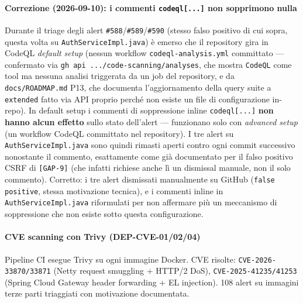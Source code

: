 ﻿\documentclass[a4paper,12pt]{report}
\newcommand{\threat}[1]{\texttt{\small\textcolor{vulnred}{[#1]}}}
\begin{document}
\paragraph{Correzione (2026-09-10): i commenti \texttt{codeql[...]} non sopprimono nulla}
Durante il triage degli alert \texttt{\#588}/\texttt{\#589}/\texttt{\#590}
(stesso falso positivo di cui sopra, questa volta su
\texttt{AuthServiceImpl.java}) è emerso che il repository gira in CodeQL
\emph{default setup} (nessun workflow \texttt{codeql-analysis.yml} committato
--- confermato via \texttt{gh api .../code-scanning/analyses}, che mostra
\texttt{CodeQL} come tool ma nessuna analisi triggerata da un job del
repository, e da \texttt{docs/ROADMAP.md} P13, che documenta l'aggiornamento
della query suite a \texttt{extended} fatto via API proprio perché non esiste
un file di configurazione in-repo). In default setup i commenti di
soppressione inline \texttt{codeql[...]} \textbf{non hanno alcun effetto}
sullo stato dell'alert --- funzionano solo con \emph{advanced setup} (un
workflow CodeQL committato nel repository). I tre alert su
\texttt{AuthServiceImpl.java} sono quindi rimasti aperti contro ogni commit
successivo nonostante il commento, esattamente come già documentato per il
falso positivo CSRF di \threat{GAP-9} (che infatti richiese anche lì un
dismissal manuale, non il solo commento). Corretto: i tre alert dismissati
manualmente su GitHub (\texttt{false positive}, stessa motivazione tecnica),
e i commenti inline in \texttt{AuthServiceImpl.java} riformulati per non
affermare più un meccanismo di soppressione che non esiste sotto questa
configurazione.

\paragraph{CVE scanning con Trivy (DEP-CVE-01/02/04)}
Pipeline CI esegue Trivy su ogni immagine Docker.
CVE risolte: \texttt{CVE-2026-33870/33871} (Netty request smuggling + HTTP/2 DoS),
\texttt{CVE-2025-41235/41253} (Spring Cloud Gateway header forwarding + EL injection).
108 alert su immagini terze parti triaggiati con motivazione documentata.
\end{document}
